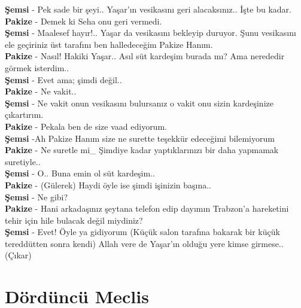 \documentclass[]{book}
\begin{document}
\textbf{Şemsi} - Pek sade bir şeyi.. Yaşar'ın vesikasını geri alacaksınız.. İşte bu kadar.\\
\textbf{Pakize} - Demek ki Seha onu geri vermedi.\\
\textbf{Şemsi} - Maalesef hayır!.. Yaşar da vesikasını bekleyip duruyor. Şunu vesikasını ele geçiriniz üst tarafını ben halledeceğim Pakize Hanım.\\
\textbf{Pakize} - Nasıl! Hakiki Yaşar.. Asıl süt kardeşim burada mı? Ama nerededir görmek isterdim..\\
\textbf{Şemsi} - Evet ama; şimdi değil..\\
\textbf{Pakize} - Ne vakit..\\
\textbf{Şemsi} - Ne vakit onun vesikasını bulursanız o vakit onu sizin kardeşinize çıkartırım.\\
\textbf{Pakize} - Pekala ben de size vaad ediyorum.\\
\textbf{Şemsi} -Ah Pakize Hanım size ne surette teşekkür edeceğimi bilemiyorum\\
\textbf{Pakize} - Ne suretle mi\_ Şimdiye kadar yaptıklarınızı bir daha yapmamak suretiyle..\\
\textbf{Şemsi} - O.. Buna emin ol süt kardeşim..\\
\textbf{Pakize} - (Gülerek) Haydi öyle ise şimdi işinizin başına..\\
\textbf{Şemsi} - Ne gibi?\\
\textbf{Pakize} - Hani arkadaşınız şeytana telefon edip dayımın Trabzon'a hareketini tehir için hile bulacak değil miydiniz?\\
\textbf{Şemsi} - Evet! Öyle ya gidiyorum (Küçük salon tarafına bakarak bir küçük tereddütten sonra kendi) Allah vere de Yaşar'ın olduğu yere kimse girmese.. (Çıkar)\\

\hypertarget{dorduncu-meclis-2}{%
\section{Dördüncü Meclis}\label{dorduncu-meclis-2}}
\end{document}
